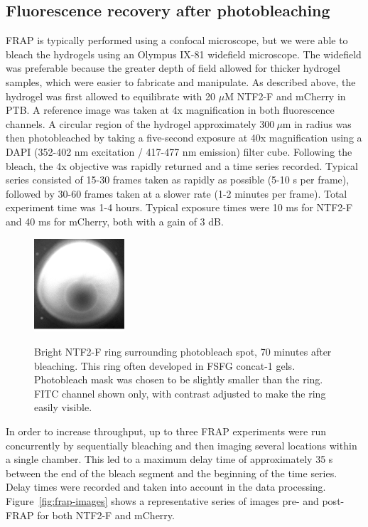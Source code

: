 \subsection{Fluorescence recovery after photobleaching}

FRAP is typically performed using a confocal microscope, but we were able to bleach the hydrogels using an Olympus IX-81 widefield microscope.  The widefield was preferable because the greater depth of field allowed for thicker hydrogel samples, which were easier to fabricate and manipulate.  As described above, the hydrogel was first allowed to equilibrate with 20 $\mu$M NTF2-F and mCherry in PTB.  A reference image was taken at 4x magnification in both fluorescence channels.  A circular region of the hydrogel approximately $300\ \mu$m in radius was then photobleached by taking a five-second exposure at 40x magnification using a DAPI (352-402 nm excitation / 417-477 nm emission) filter cube.  Following the bleach, the 4x objective was rapidly returned and a time series recorded.  Typical series consisted of 15-30 frames taken as rapidly as possible (5-10 s per frame), followed by 30-60 frames taken at a slower rate (1-2 minutes per frame).  Total experiment time was 1-4 hours.  Typical exposure times were 10 ms for NTF2-F and 40 ms for mCherry, both with a gain of 3 dB.

\begin{figure}
\caption[Bright NTF2-F ring surrounding photobleach spot.]{Bright NTF2-F ring surrounding photobleach spot, 70 minutes after bleaching.  This ring often developed in FSFG concat-1 gels.  Photobleach mask was chosen to be slightly smaller than the ring.  FITC channel shown only, with contrast adjusted to make the ring easily visible.}
\centering
\includegraphics[width=0.3\textwidth]{figs/ch04/ring}
\label{fig:ring}
\end{figure} 

In order to increase throughput, up to three FRAP experiments were run concurrently by sequentially bleaching and then imaging several locations within a single chamber.  This led to a maximum delay time of approximately 35 s between the end of the bleach segment and the beginning of the time series.  Delay times were recorded and taken into account in the data processing. Figure~\ref{fig:frap-images} shows a representative series of images pre- and post-FRAP for both NTF2-F and mCherry.

